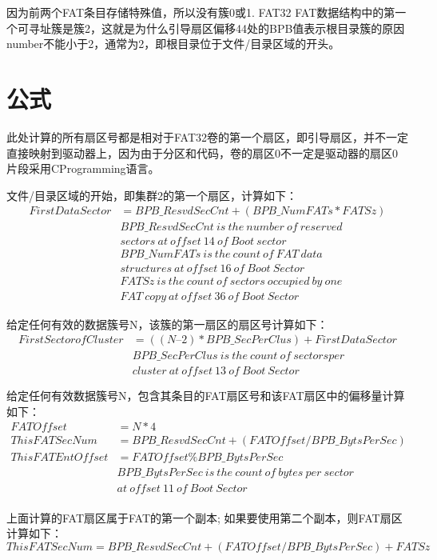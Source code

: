 因为前两个FAT条目存储特殊值，所以没有簇0或1. FAT32 FAT数据结构中的第一个可寻址簇是簇2，这就是为什么引导扇区偏移44处的BPB值表示根目录簇的原因 number不能小于2，通常为2，即根目录位于文件/目录区域的开头。

\section{公式}
此处计算的所有扇区号都是相对于FAT32卷的第一个扇区，即引导扇区，并不一定直接映射到驱动器上，因为由于分区和代码，卷的扇区0不一定是驱动器的扇区0 片段采用CProgramming语言。
\par
文件/目录区域的开始，即集群2的第一个扇区，计算如下：
\begin{equation}
\begin{aligned}
FirstDataSector &= BPB\_ResvdSecCnt + (BPB\_NumFATs * FATSz)\\
&BPB\_ResvdSecCnt\ is \ the \ number \ of \ reserved\\
&sectors\ at \ offset\ 14\ of\ Boot\ sector\\
&BPB\_NumFATs\ is\ the\ count\ of\ FAT\ data\\
&structures\ at\ offset\ 16\ of\ Boot\ Sector\\
&FATSz\ is\ the\ count\ of\ sectors\ occupied\ by\ one\\
&FAT\ copy\ at\ offset\ 36\ of\ Boot\ Sector
\end{aligned}
\end{equation}

\par
给定任何有效的数据簇号N，该簇的第一扇区的扇区号计算如下：
\begin{equation}
\begin{aligned}
FirstSectorofCluster &= ((N – 2) *BPB\_SecPerClus) + FirstDataSector\\
&BPB\_SecPerClus\ is\ the\ count\ of\ sectors per\\
&cluster\ at\ offset\ 13\ of\ Boot\ Sector
\end{aligned}
\end{equation}

\par
给定任何有效数据簇号N，包含其条目的FAT扇区号和该FAT扇区中的偏移量计算如下：
\begin{equation}
\begin{aligned}
FATOffset &= N * 4\\
ThisFATSecNum &= BPB\_ResvdSecCnt +(FATOffset / BPB\_BytsPerSec)\\
ThisFATEntOffset &= FATOffset \%BPB\_BytsPerSec\\
&BPB\_BytsPerSec\ is\ the\ count\ of\ bytes\ per\ sector\\
&at\ offset\ 11\ of\ Boot\ Sector\\
\end{aligned}
\end{equation}

\par
上面计算的FAT扇区属于FAT的第一个副本; 如果要使用第二个副本，则FAT扇区计算如下：
\begin{equation}
ThisFATSecNum = BPB\_ResvdSecCnt +(FATOffset / BPB\_BytsPerSec)+ FATSz
\end{equation}













